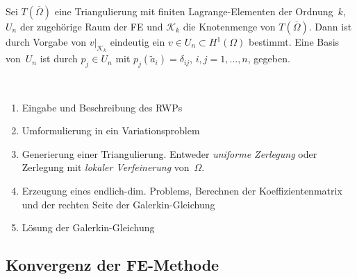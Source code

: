 \documentclass{cheat-sheet}
\newcommand{\clos}[1]{\overline{#1}} %
\newcommand{\cOmega}{\clos{\Omega}} %
\begin{document}


\begin{satz}[$k \geq 1$]
  Sei $T(\cOmega)$ eine Triangulierung mit finiten Lagrange-Elementen der Ordnung~$k$, $U_n$ der zugehörige Raum der FE und $\mathcal{K}_k$ die Knotenmenge von $T(\cOmega)$.
  Dann ist durch Vorgabe von $v|_{\mathcal{K}_k}$ eindeutig ein $v \in U_n \subset H^1(\Omega)$ bestimmt.
  Eine Basis von~$U_n$ ist durch $p_j \in U_n$ mit $p_j(\tilde{a}_i) = \delta_{ij}$, $i, j = 1, \ldots, n$, gegeben.
\end{satz}

\begin{samepage}


\begin{verf} \mbox{} \\
  \begin{enumerate}
    \item Eingabe und Beschreibung des RWPs
    \item Umformulierung in ein Variationsproblem
    \item Generierung einer Triangulierung. Entweder \textit{uniforme Zerlegung} oder Zerlegung mit \textit{lokaler Verfeinerung} von~$\Omega$.
    \item Erzeugung eines endlich-dim. Problems, \dh{} Berechnen der Koeffizientenmatrix und der rechten Seite der Galerkin-Gleichung 
    \item Lösung der Galerkin-Gleichung
  \end{enumerate}
\end{verf}






\subsection{Konvergenz der FE-Methode}

\end{samepage}
\end{document}
